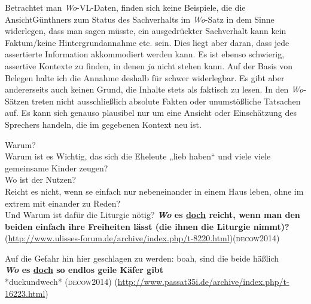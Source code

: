 {Betrachtet man \textit{Wo}-VL-Daten, finden sich keine Beispiele, die die Ansicht\linebreak Günthners zum Status des Sachverhalts im \textit{Wo}-Satz in dem Sinne widerlegen, dass man sagen müsste, ein ausgedrückter Sachverhalt kann kein Faktum/keine Hintergrundannahme etc. sein. Dies liegt aber daran, dass jede assertierte Information akkommodiert  werden kann. Es ist ebenso schwierig, assertive Kontexte zu finden, in denen \textit{ja} nicht stehen kann. Auf der Basis von Belegen halte ich die Annahme deshalb für schwer widerlegbar. Es gibt aber andererseits auch keinen Grund, die Inhalte stets als faktisch zu lesen. In den \textit{Wo}-Sätzen treten nicht ausschließlich absolute Fakten oder unumstößliche Tatsachen auf. Es kann sich genauso plausibel nur um eine Ansicht oder Einschätzung des Sprechers handeln, die im gegebenen Kontext neu ist.

\begin{exe}
	\ex\label{959}
	Warum?\\
	Warum ist es Wichtig, das sich die Eheleute „lieb haben“ und viele viele gemeinsame Kinder zeugen?\\
	Wo ist der Nutzen?\\
	Reicht es nicht, wenn se einfach nur nebeneinander in einem Haus leben, ohne im extrem mit einander zu Reden?\\
	Und Warum ist dafür die Liturgie nötig? \textbf{\textit{Wo} es \ul{doch} reicht, wenn man den beiden einfach ihre Freiheiten lässt (die ihnen 		die Liturgie nimmt)?}\newline
	{\scriptsize(\url{http://www.ulisses-forum.de/archive/index.php/t-8220.html})}\hfill\hbox{\scshape(decow2014)}
\end{exe}
 
\begin{exe}
	\ex\label{960}

	Auf die Gefahr hin hier geschlagen zu werden: boah, sind die beide häßlich\\
	\textbf{\textit{Wo} es \ul{doch} so endlos geile Käfer gibt}\\
	*duckundwech*			
	\hfill\hbox{\scshape(decow2014)}
	\newline
	{\scriptsize(\url{http://www.passat35i.de/archive/index.php/t-16223.html})}
\end{exe}					                 

\begin{exe}
	\ex\label{961}


\end{exe}}
